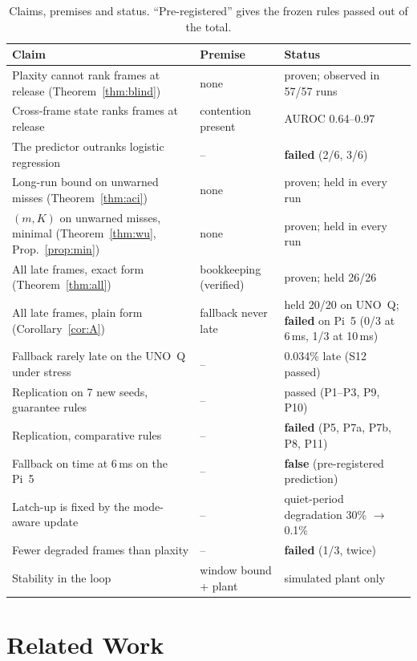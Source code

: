 \documentclass[acmsmall,screen]{acmart}
\begin{document}
\begin{table}[t]
\caption{Claims, premises and status. ``Pre-registered'' gives the frozen rules passed out of the total.}
\label{tab:claims}
\footnotesize
\begin{tabular}{@{}p{}p{}p{}@{}}
\toprule
Claim & Premise & Status \\
\midrule
Plaxity cannot rank frames at release (Theorem~\ref{thm:blind}) & none & proven; observed in 57/57 runs \\
Cross-frame state ranks frames at release & contention present & AUROC 0.64--0.97 \\
The predictor outranks logistic regression & -- & \textbf{failed} (2/6, 3/6) \\
Long-run bound on unwarned misses (Theorem~\ref{thm:aci}) & none & proven; held in every run \\
$(m,K)$ on unwarned misses, minimal (Theorem~\ref{thm:wu}, Prop.~\ref{prop:min}) & none & proven; held in every run \\
All late frames, exact form (Theorem~\ref{thm:all}) & bookkeeping (verified) & proven; held 26/26 \\
All late frames, plain form (Corollary~\ref{cor:A}) & fallback never late & held 20/20 on UNO~Q; \textbf{failed} on Pi~5 (0/3 at 6\,ms, 1/3 at 10\,ms) \\
Fallback rarely late on the UNO~Q under stress & -- & 0.034\% late (S12 passed) \\
Replication on 7 new seeds, guarantee rules & -- & passed (P1--P3, P9, P10) \\
Replication, comparative rules & -- & \textbf{failed} (P5, P7a, P7b, P8, P11) \\
Fallback on time at 6\,ms on the Pi~5 & -- & \textbf{false} (pre-registered prediction) \\
Latch-up is fixed by the mode-aware update & -- & quiet-period degradation 30\% $\to$ 0.1\% \\
Fewer degraded frames than plaxity & -- & \textbf{failed} (1/3, twice) \\
Stability in the loop & window bound + plant & simulated plant only \\
\bottomrule
\end{tabular}
\end{table}

\section{Related Work}\label{sec:related}
\end{document}
